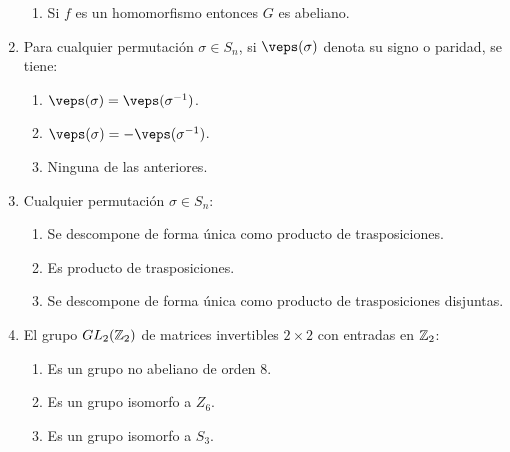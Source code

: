 \documentclass[12pt]{article}
\begin{document}
\begin{ejercicio}
\begin{enumerate}
\begin{enumerate}
                \item Si $f$ es un homomorfismo entonces $G$ es abeliano.
            \end{enumerate}
            \item Para cualquier permutación $\sigma \in S_n$, si $\veps(\sigma)$ denota su signo o paridad, se tiene:
            \begin{enumerate}
                \item $\veps(\sigma) = \veps(\sigma^{-1})$.
                \item $\veps(\sigma) = -\veps(\sigma^{-1})$.
                \item Ninguna de las anteriores.
            \end{enumerate}
            \item Cualquier permutación $\sigma \in S_n$:
            \begin{enumerate}
                \item Se descompone de forma única como producto de trasposiciones.
                \item Es producto de trasposiciones.
                \item Se descompone de forma única como producto de trasposiciones disjuntas.
            \end{enumerate}
            \item El grupo $GL_2(\mathbb{Z}_2)$ de matrices invertibles $2 \times 2$ con entradas en $\mathbb{Z}_2$:
            \begin{enumerate}
                \item Es un grupo no abeliano de orden 8.
                \item Es un grupo isomorfo a $Z_6$.
                \item Es un grupo isomorfo a $S_3$.
            \end{enumerate}
                
        \end{enumerate}
    \end{ejercicio}
\end{document}
